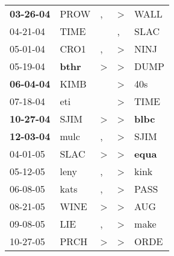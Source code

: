 \begin{supertabular}{p{0.07\textwidth}p{0.06\textwidth}p{0.02\textwidth}p{0.02\textwidth}p{0.06\textwidth}}
 \textbf{03-26-04\textsuperscript{}} &           PROW\textsuperscript{} &                , &     \textgreater &           WALL\textsuperscript{} \\
          04-21-04\textsuperscript{} &           TIME\textsuperscript{} &                  &                , &           SLAC\textsuperscript{} \\
          05-01-04\textsuperscript{} &           CRO1\textsuperscript{} &                , &     \textgreater &           NINJ\textsuperscript{} \\
          05-19-04\textsuperscript{} &  \textbf{bthr\textsuperscript{}} &     \textgreater &     \textgreater &           DUMP\textsuperscript{} \\
 \textbf{06-04-04\textsuperscript{}} &           KIMB\textsuperscript{} &                  &     \textgreater &            40s\textsuperscript{} \\
          07-18-04\textsuperscript{} &            eti\textsuperscript{} &                  &     \textgreater &           TIME\textsuperscript{} \\
 \textbf{10-27-04\textsuperscript{}} &           SJIM\textsuperscript{} &     \textgreater &     \textgreater &  \textbf{blbc\textsuperscript{}} \\
 \textbf{12-03-04\textsuperscript{}} &           mulc\textsuperscript{} &                , &     \textgreater &           SJIM\textsuperscript{} \\
          04-01-05\textsuperscript{} &           SLAC\textsuperscript{} &     \textgreater &     \textgreater &  \textbf{equa\textsuperscript{}} \\
          05-12-05\textsuperscript{} &           leny\textsuperscript{} &                , &     \textgreater &           kink\textsuperscript{} \\
          06-08-05\textsuperscript{} &           kats\textsuperscript{} &                , &     \textgreater &           PASS\textsuperscript{} \\
          08-21-05\textsuperscript{} &           WINE\textsuperscript{} &     \textgreater &     \textgreater &            AUG\textsuperscript{} \\
          09-08-05\textsuperscript{} &            LIE\textsuperscript{} &                , &     \textgreater &           make\textsuperscript{} \\
          10-27-05\textsuperscript{} &           PRCH\textsuperscript{} &     \textgreater &     \textgreater &           ORDE\textsuperscript{} \\

\end{supertabular}
